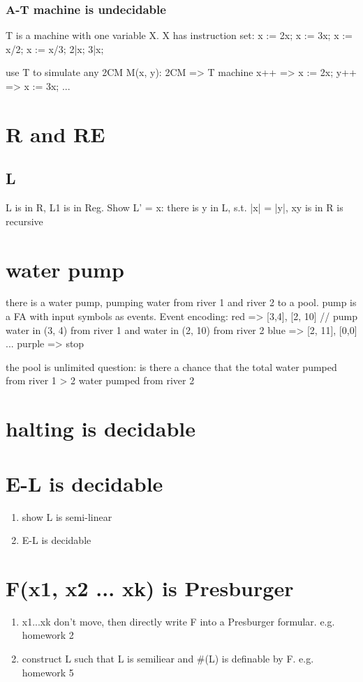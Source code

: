 \documentclass{article}
\begin{document}
\subsubsection{A-T machine is undecidable}
T is a machine with one variable X. X has instruction set:
x := 2x;
x := 3x;
x := x/2;
x := x/3;
2|x;
3|x;

use T to simulate any 2CM M(x, y):
2CM => T machine
x++ => x := 2x;
y++ => x := 3x;
...

\section{R and RE}

\subsection{L}
L is in R, L1 is in Reg. Show L' = {x: there is y in L, s.t. |x| = |y|, xy is in R} is recursive

\section{water pump}
there is a water pump, pumping water from river 1 and river 2 to a pool. pump is a FA with input symbols as events. Event encoding:
red => [3,4], [2, 10] // pump water in (3, 4) from river 1 and water in (2, 10) from river 2
blue => [2, 11], [0,0]
...
purple => stop

the pool is unlimited
question: is there a chance that the total water pumped from river 1 > 2 water pumped from river 2


\section{halting is decidable}

\section{E-L is decidable}
\begin{enumerate}
	\item show L is semi-linear
	\item E-L is decidable
\end{enumerate}

\section{F(x1, x2 ... xk) is Presburger}
\begin{enumerate}
	\item x1...xk don't move, then directly write F into a Presburger formular. e.g. homework 2
	\item construct L such that L is semiliear and \#(L) is definable by F. e.g. homework 5
\end{enumerate}
\end{document}
